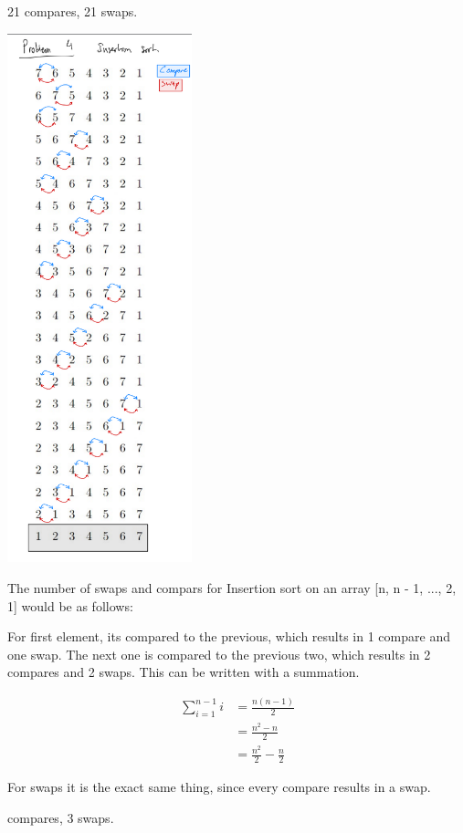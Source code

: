 \documentclass[11pt,largemargins]{homework}
\begin{document}
\begin{alphaparts}
  \questionpart

  21 compares, 21 swaps.

  \includegraphics[width=0.4\textwidth]{hw1drawings/4a.png}

  \newpage
  \questionpart
  The number of swaps and compars for Insertion sort on an array [n, n - 1, ..., 2, 1] would be as follows:

  For first element, its compared to the previous, which results in 1 compare and one swap. The next one is
  compared to the previous two, which results in 2 compares and 2 swaps. This can be written with a summation.

  \begin{align*}
    \sum_{i = 1}^{n - 1} i &= \frac{n(n - 1)}{2} \\
    &= \frac{n^2 - n}{2} \\
    &= \frac{n^2}{2} - \frac{n}{2}
  \end{align*}

  For swaps it is the exact same thing, since every compare results in a swap.
  
  \newpage
   compares, 3 swaps.


\end{alphaparts}
\end{document}
